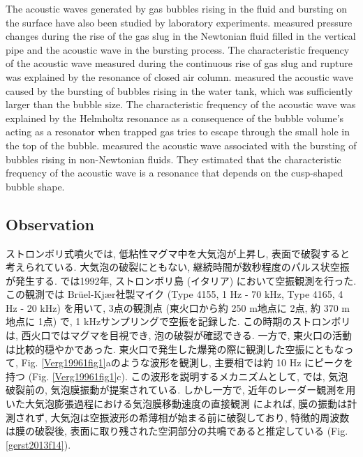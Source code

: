 \documentclass[12pt]{article}
\begin{document}
The acoustic waves generated by gas bubbles rising in the fluid and bursting on the surface have also been studied by laboratory experiments.
\cite{James2004} measured pressure changes during the rise of the gas slug in the Newtonian fluid filled in the vertical pipe and the acoustic wave in the bursting process.
The characteristic frequency of the acoustic wave measured during the continuous rise of gas slug and rupture was explained by the resonance of closed air column.
\cite{Spiel1992} measured the acoustic wave caused by the bursting of bubbles rising in the water tank, which was sufficiently larger than the bubble size.
The characteristic frequency of the acoustic wave was explained by the Helmholtz resonance as a consequence of the bubble volume's acting as a resonator when trapped gas tries to escape through the small hole in the top of the bubble.
\cite{Divoux2008} measured the acoustic wave associated with the bursting of bubbles rising in non-Newtonian fluids.
They estimated that the characteristic frequency of the acoustic wave is a resonance that depends on the cusp-shaped bubble shape.

\subsection{Observation}\label{AcoinObs}

ストロンボリ式噴火では, 低粘性マグマ中を大気泡が上昇し, 表面で破裂すると考えられている. 大気泡の破裂にともない, 継続時間が数秒程度のパルス状空振が発生する.
\cite{Vergniolle1996b} では1992年, ストロンボリ島 (イタリア) において空振観測を行った. この観測では Br\"uel-Kj\ae r社製マイク (Type 4155, 1 Hz - 70 kHz, Type 4165, 4 Hz - 20 kHz) を用いて, 3点の観測点 (東火口から約 250 m地点に 2点, 約 370 m地点に 1点) で, 1 kHzサンプリングで空振を記録した. 
この時期のストロンボリは, 西火口ではマグマを目視でき, 泡の破裂が確認できる. 一方で, 東火口の活動は比較的穏やかであった. 
東火口で発生した爆発の際に観測した空振にともなって, Fig. \ref{Verg19961fig1}aのような波形を観測し, 主要相では約 10 Hz にピークを持つ (Fig. \ref{Verg19961fig1}c). この波形を説明するメカニズムとして, \cite{Vergniolle1996c} では, 気泡破裂前の, 気泡膜振動が提案されている. 
しかし一方で, 近年のレーダー観測を用いた大気泡膨張過程における気泡膜移動速度の直接観測   \citep{Gerst2013a} によれば, 膜の振動は計測されず, 大気泡は空振波形の希薄相が始まる前に破裂しており, 特徴的周波数は膜の破裂後, 表面に取り残された空洞部分の共鳴であると推定している (Fig. \ref{gerst2013f14}).
\end{document}
